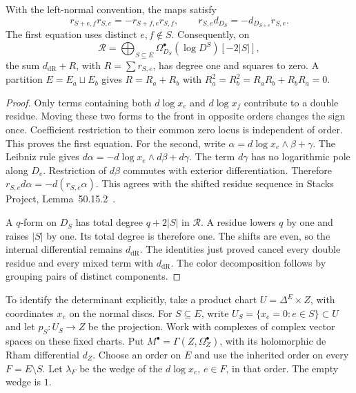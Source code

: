 \begin{proposition}
\label{prop:residue-identities}
With the left-normal convention, the maps satisfy
\begin{equation}
\label{eq:residue-relations}
r_{S+e,f}r_{S,e}=-r_{S+f,e}r_{S,f},\qquad
r_{S,e}d_{D_S}=-d_{D_{S+e}}r_{S,e}.
\end{equation}
The first equation uses distinct $e,f\notin S$.
Consequently, on
\[
\mathcal R=\bigoplus_{S\subseteq E}
\Omega^\bullet_{D_S}(\log D^S)[-2|S|],
\]
the sum $d_{\mathrm{dR}}+R$, with $R=\sum r_{S,e}$, has degree one and squares to zero.
A partition $E=E_a\sqcup E_b$ gives $R=R_a+R_b$ with
$R_a^2=R_b^2=R_aR_b+R_bR_a=0$.
\end{proposition}

\begin{proof}
Only terms containing both $d\log x_e$ and $d\log x_f$ contribute to a double residue.
Moving these two forms to the front in opposite orders changes the sign once.
Coefficient restriction to their common zero locus is independent of order.
This proves the first equation.
For the second, write $\alpha=d\log x_e\wedge\beta+\gamma$.
The Leibniz rule gives
$d\alpha=-d\log x_e\wedge d\beta+d\gamma$.
The term $d\gamma$ has no logarithmic pole along $D_e$.
Restriction of $d\beta$ commutes with exterior differentiation.
Therefore $r_{S,e}d\alpha=-d(r_{S,e}\alpha)$.
This agrees with the shifted residue sequence in
Stacks Project, Lemma~50.15.2~\cite{StacksResidue}.

A $q$-form on $D_S$ has total degree $q+2|S|$ in $\mathcal R$.
A residue lowers $q$ by one and raises $|S|$ by one.
Its total degree is therefore one.
The shifts are even, so the internal differential remains $d_{\mathrm{dR}}$.
The identities just proved cancel every double residue and every mixed term with $d_{\mathrm{dR}}$.
The color decomposition follows by grouping pairs of distinct components.
\end{proof}

To identify the determinant explicitly, take a product chart
$U=\Delta^E\times Z$, with coordinates $x_e$ on the normal discs.
For $S\subseteq E$, write $U_S=\{x_e=0:e\in S\}\subset U$ and
let $p_S:U_S\to Z$ be the projection.
Work with complexes of complex vector spaces on these fixed charts.
Put $M^\bullet=\Gamma(Z,\Omega_Z^\bullet)$, with its holomorphic de Rham differential $d_Z$.
Choose an order on $E$ and use the inherited order on every $F=E\setminus S$.
Let $\lambda_F$ be the wedge of the $d\log x_e$, $e\in F$, in that order.
The empty wedge is $1$.

